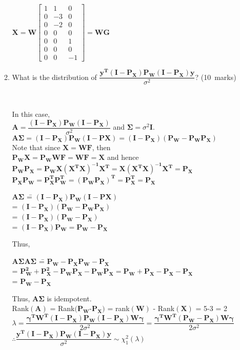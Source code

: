 \documentclass[soln,12pt]{utarexam}
\begin{document}
\begin{enumerate}
\begin{enumerate}
\begin{answer}
           $\mathbf{X} = \mathbf{W}
      \begin{bmatrix}
        1&1&0\\0&-3&0\\0&-2&0\\0&0&0\\0&0&1\\0&0&0\\0&0&-1
      \end{bmatrix} = \mathbf{WG}$      
    \end{answer}
  
  \item What is the distribution of $\dfrac{\mathbf{y^T(I-P_X)P_W(I-P_X)y}}{\sigma^2}$? \hfill(10~marks)
    \begin{answer}~
      
In this case,\\
      $\mathbf{A} = \dfrac{\mathbf{(I-P_X)P_W(I-P_X)}}{\sigma^2}$ and $\bm{\Sigma} = \sigma^2\mathbf{I}$.\\ 
      $\mathbf{A}\bm{\Sigma} = \mathbf{(I-P_X)P_W(I-PX)} = \mathbf{(I-P_X)(P_W - P_WP_X)}$\\
      Note that since $\mathbf{X} = \mathbf{WF}$, then \\
      $\mathbf{P_WX} = \mathbf{P_WWF} = \mathbf{WF} = \mathbf{X}$ and hence\\ 
      $\mathbf{P_WP_X} = \mathbf{P_WX(X^TX)^{-1}X^T} = \mathbf{X(X^TX)^{-1}X^T} = \mathbf{P_X}$\\
      $\mathbf{P_XP_W} = \mathbf{P_X^TP_W^T} = \mathbf{(P_WP_X)^T} = \mathbf{P_X^T} = \mathbf{P_X}$
      \begin{tabbing}
        $\mathbf{A}\bm{\Sigma}$ \== $\mathbf{(I-P_X)P_W(I-PX)}$\\
        \>= $\mathbf{(I-P_X)(P_W - P_WP_X)}$\\
        \>= $\mathbf{(I-P_X)(P_W-P_X)}$\\
        \>= $\mathbf{(I-P_X)P_W} = \mathbf{P_W-P_X}$
      \end{tabbing}
      Thus,
      \begin{tabbing}
        $\mathbf{A}\bm{\Sigma}\mathbf{A}\bm{\Sigma}$ \== $\mathbf{P_W-P_X}\mathbf{P_W-P_X}$\\
        \>= $\mathbf{P_W^2}+\mathbf{P_X^2} - \mathbf{P_WP_X} - \mathbf{P_WP_X} = \mathbf{P_W} + \mathbf{P_X} - \mathbf{P_X} - \mathbf{P_X}$\\
        \>= $\mathbf{P_W} -\mathbf{P_X}$
      \end{tabbing}
 Thus, $\mathbf{A}\bm{\Sigma}$ is idempotent.\\
 Rank$(\mathbf{A})$ = Rank$(\mathbf{P_W}$-$\mathbf{P_X})$ = rank$(\mathbf{W})$ - Rank$(\mathbf{X})$ = 5-3 = 2\\
 $\lambda = \dfrac{\bm{\gamma}\mathbf{^TW^T(I-P_X)P_W(I-P_X)W}\bm{\gamma}}{2\sigma^2} = \dfrac{\bm{\gamma}\mathbf{^TW^T(P_W-P_X)W}\bm{\gamma}}{2\sigma^2} $\\
$\therefore \dfrac{\mathbf{y^T(I-P_X)P_W(I-P_X)y}}{\sigma^2} \sim \chi^2_1(\lambda)$      
    \end{answer}


\end{enumerate}
\end{enumerate}
\end{document}
